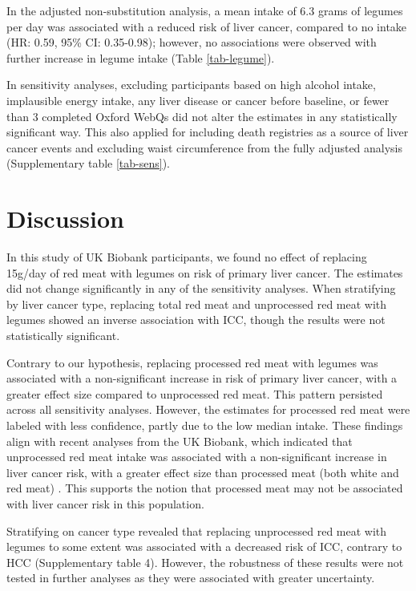 \documentclass[sn-basic,Numbered,iicol,pdflatex]{sn-jnl}
\begin{document}
In the adjusted non-substitution analysis, a mean intake of 6.3 grams of
legumes per day was associated with a reduced risk of liver cancer,
compared to no intake
(HR: 0.59, 95\% CI: 0.35-0.98);
however, no associations were observed with further increase in legume
intake (Table \ref{tab-legume}).

In sensitivity analyses, excluding participants based on high alcohol
intake, implausible energy intake, any liver disease or cancer before
baseline, or fewer than 3 completed Oxford WebQs did not alter the
estimates in any statistically significant way. This also applied for
including death registries as a source of liver cancer events and
excluding waist circumference from the fully adjusted analysis
(Supplementary table \ref{tab-sens}).

\hypertarget{sec4}{%
\section{Discussion}\label{sec4}}

In this study of UK Biobank participants, we found no effect of
replacing 15g/day of red meat with legumes on risk of primary liver
cancer. The estimates did not change significantly in any of the
sensitivity analyses. When stratifying by liver cancer type, replacing
total red meat and unprocessed red meat with legumes showed an inverse
association with ICC, though the results were not statistically
significant.

Contrary to our hypothesis, replacing processed red meat with legumes
was associated with a non-significant increase in risk of primary liver
cancer, with a greater effect size compared to unprocessed red meat.
This pattern persisted across all sensitivity analyses. However, the
estimates for processed red meat were labeled with less confidence,
partly due to the low median intake. These findings align with recent
analyses from the UK Biobank, which indicated that unprocessed red meat
intake was associated with a non-significant increase in liver cancer
risk, with a greater effect size than processed meat (both white and red
meat) \citep{Knuppel2020}. This supports the notion that processed meat may
not be associated with liver cancer risk in this population.

Stratifying on cancer type revealed that replacing unprocessed red meat
with legumes to some extent was associated with a decreased risk of ICC,
contrary to HCC (Supplementary table 4). However, the robustness of
these results were not tested in further analyses as they were
associated with greater uncertainty.
\end{document}
